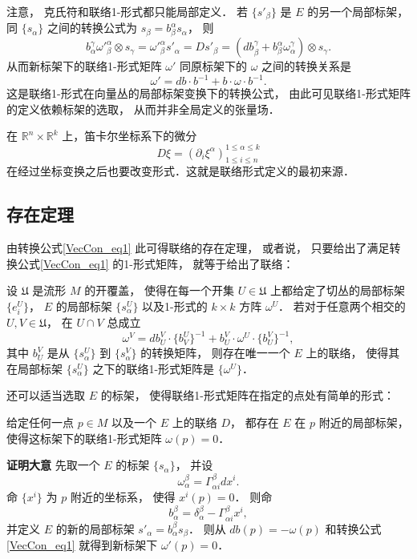 注意， 克氏符和联络1-形式都只能局部定义． 若 $\{s'_\beta\}$ 是 $E$ 的另一个局部标架， 同 $\{s_\alpha\}$ 之间的转换公式为 $s_\beta=b_\beta^\alpha s_\alpha$， 则
$$
b_\alpha^\gamma{\omega'}_{\beta}^{\alpha}\otimes s_\gamma={\omega'}_{\beta}^{\alpha}s'_\alpha=Ds'_\beta=(db_\beta^\gamma+b_\beta^\alpha\omega_\alpha^\gamma)\otimes s_\gamma.
$$
从而新标架下的联络1-形式矩阵 $\omega'$ 同原标架下的 $\omega$ 之间的转换关系是
\begin{equation}\label{VecCon_eq1}
\omega'=db\cdot b^{-1}+b\cdot\omega\cdot b^{-1}.
\end{equation}
这是联络1-形式在向量丛的局部标架变换下的转换公式， 由此可见联络1-形式矩阵的定义依赖标架的选取， 从而并非全局定义的张量场．

在 $\mathbb{R}^n\times\mathbb{R}^k$ 上，笛卡尔坐标系下的微分
$$
D\xi=(\partial_i\xi^\alpha)_{1\leq i\leq n}^{1\leq\alpha\leq k}
$$
在经过坐标变换之后也要改变形式．这就是联络形式定义的最初来源．

\subsection{存在定理}
由转换公式\autoref{VecCon_eq1} 此可得联络的存在定理， 或者说， 只要给出了满足转换公式\autoref{VecCon_eq1} 的1-形式矩阵， 就等于给出了联络：
\begin{theorem}{}
设 $\mathfrak{U}$ 是流形 $M$ 的开覆盖， 使得在每一个开集 $U\in\mathfrak{U}$ 上都给定了切丛的局部标架 $\{e^U_i\}$， $E$ 的局部标架 $\{s^U_\alpha\}$ 以及1-形式的 $k\times k$ 方阵 $\omega^U$． 若对于任意两个相交的 $U,V\in\mathfrak{U}$， 在 $U\cap V$ 总成立
$$
\omega^V=db^V_U\cdot \{b_V^U\}^{-1}+b^V_U\cdot\omega^U\cdot \{b^V_U\}^{-1},
$$
其中 $b^V_U$ 是从 $\{s^U_\alpha\}$ 到 $\{s^V_\alpha\}$ 的转换矩阵， 则存在唯一一个 $E$ 上的联络， 使得其在局部标架 $\{s^U_\alpha\}$ 之下的联络1-形式矩阵是 $\{\omega^U\}$．
\end{theorem}

还可以适当选取 $E$ 的标架， 使得联络1-形式矩阵在指定的点处有简单的形式：
\begin{theorem}{}
给定任何一点 $p\in M$ 以及一个 $E$ 上的联络 $D$， 都存在 $E$ 在 $p$ 附近的局部标架， 使得这标架下的联络1-形式矩阵 $\omega(p)=0$．
\end{theorem}
\textbf{证明大意} 先取一个 $E$ 的标架 $\{s_\alpha\}$， 并设
$$
\omega^\beta_\alpha=\Gamma_{\alpha i}^\beta dx^i.
$$
命 $\{x^i\}$ 为 $p$ 附近的坐标系， 使得 $x^i(p)=0$． 则命
$$
b_\alpha^\beta=\delta_\alpha^\beta-\Gamma_{\alpha i}^\beta x^i,
$$
并定义 $E$ 的新的局部标架 $s'_\alpha=b_\alpha^\beta s_\beta$． 则从 $db(p)=-\omega(p)$ 和转换公式\autoref{VecCon_eq1} 就得到新标架下 $\omega'(p)=0$．

